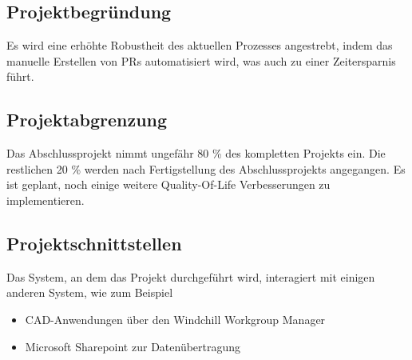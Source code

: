 
\subsection{Projektbegründung} 
\label{sec:Projektbegruendung}
Es wird eine erhöhte Robustheit des aktuellen Prozesses angestrebt, indem das manuelle Erstellen von \acp{PR} automatisiert wird, was auch zu einer Zeitersparnis führt.

\subsection{Projektabgrenzung}
Das Abschlussprojekt nimmt ungefähr 80 \% des kompletten Projekts ein.
Die restlichen 20 \% werden nach Fertigstellung des Abschlussprojekts angegangen.
Es ist geplant, noch einige weitere Quality-Of-Life Verbesserungen zu implementieren.

\subsection{Projektschnittstellen}
\label{sec:Projektschnittstellen}

Das System, an dem das Projekt durchgeführt wird, interagiert mit einigen anderen System, wie zum Beispiel
\begin{itemize}
    \item CAD-Anwendungen über den Windchill Workgroup Manager
    \item Microsoft Sharepoint zur Datenübertragung
\end{itemize}


